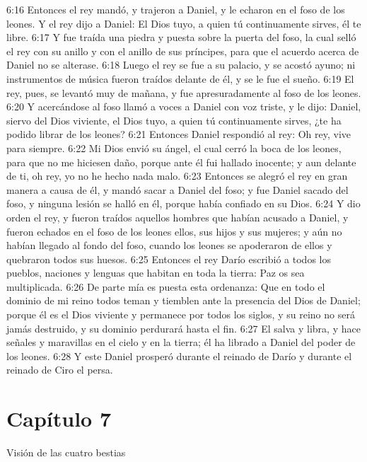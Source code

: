 6:16 Entonces el rey mandó, y trajeron a Daniel, y le echaron en el foso de los leones. Y el rey dijo a Daniel: El Dios tuyo, a quien tú continuamente sirves, él te libre. 
6:17 Y fue traída una piedra y puesta sobre la puerta del foso, la cual selló el rey con su anillo y con el anillo de sus príncipes, para que el acuerdo acerca de Daniel no se alterase. 
6:18 Luego el rey se fue a su palacio, y se acostó ayuno; ni instrumentos de música fueron traídos delante de él, y se le fue el sueño. 
6:19 El rey, pues, se levantó muy de mañana, y fue apresuradamente al foso de los leones. 
6:20 Y acercándose al foso llamó a voces a Daniel con voz triste, y le dijo: Daniel, siervo del Dios viviente, el Dios tuyo, a quien tú continuamente sirves, ¿te ha podido librar de los leones? 
6:21 Entonces Daniel respondió al rey: Oh rey, vive para siempre. 
6:22 Mi Dios envió su ángel, el cual cerró la boca de los leones, para que no me hiciesen daño, porque ante él fui hallado inocente; y aun delante de ti, oh rey, yo no he hecho nada malo. 
6:23 Entonces se alegró el rey en gran manera a causa de él, y mandó sacar a Daniel del foso; y fue Daniel sacado del foso, y ninguna lesión se halló en él, porque había confiado en su Dios. 
6:24 Y dio orden el rey, y fueron traídos aquellos hombres que habían acusado a Daniel, y fueron echados en el foso de los leones ellos, sus hijos y sus mujeres; y aún no habían llegado al fondo del foso, cuando los leones se apoderaron de ellos y quebraron todos sus huesos. 
6:25 Entonces el rey Darío escribió a todos los pueblos, naciones y lenguas que habitan en toda la tierra: Paz os sea multiplicada. 
6:26 De parte mía es puesta esta ordenanza: Que en todo el dominio de mi reino todos teman y tiemblen ante la presencia del Dios de Daniel; porque él es el Dios viviente y permanece por todos los siglos, y su reino no será jamás destruido, y su dominio perdurará hasta el fin. 
6:27 El salva y libra, y hace señales y maravillas en el cielo y en la tierra; él ha librado a Daniel del poder de los leones. 
6:28 Y este Daniel prosperó durante el reinado de Darío y durante el reinado de Ciro el persa. 
\section*{Capítulo 7 }
Visión de las cuatro bestias 
 
